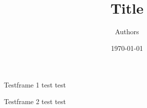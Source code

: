 \documentclass[usenames,dvipsnames]{beamer}
\author{Authors}
\title{Title}
\institute{Warwick Medical School}
\date{\today}
\begin{document}
 
\begin{frame}[t,plain]
 \titlepage
 \end{frame}


\begin{frame}{Testframe 1}
test test
\end{frame}

\begin{frame}{Testframe 2}
test test
\end{frame}
\end{document}
